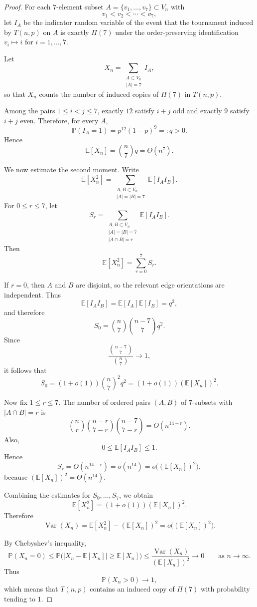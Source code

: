 \documentclass{article}
\theoremstyle{definition}
\theoremstyle{plain}
\theoremstyle{remark}
\theoremstyle{definition}
\begin{document}
\begin{proof}
For each $7$-element subset $A=\{v_1,\dots,v_7\}\subset V_n$ with
\[
v_1<v_2<\cdots<v_7,
\]
let $I_A$ be the indicator random variable of the event that the tournament induced by $T(n,p)$ on $A$
is exactly $\Pi(7)$ under the order-preserving identification $v_i\mapsto i$ for $i=1,\dots,7$.

Let
\[
X_n=\sum_{\substack{A\subset V_n\\ |A|=7}} I_A,
\]
so that $X_n$ counts the number of induced copies of $\Pi(7)$ in $T(n,p)$.

Among the pairs $1\le i<j\le 7$, exactly $12$ satisfy $i+j$ odd and exactly $9$ satisfy $i+j$ even.
Therefore, for every $A$,
\[
\mathbb P(I_A=1)=p^{12}(1-p)^9=:q>0.
\]
Hence
\[
\mathbb E[X_n]=\binom{n}{7}q=\Theta(n^7).
\]

We now estimate the second moment.
Write
\[
\mathbb E[X_n^2]
=
\sum_{\substack{A,B\subset V_n\\ |A|=|B|=7}}
\mathbb E[I_A I_B].
\]
For $0\le r\le 7$, let
\[
S_r
=
\sum_{\substack{A,B\subset V_n\\ |A|=|B|=7\\ |A\cap B|=r}}
\mathbb E[I_A I_B].
\]
Then
\[
\mathbb E[X_n^2]=\sum_{r=0}^7 S_r.
\]

If $r=0$, then $A$ and $B$ are disjoint, so the relevant edge orientations are independent. Thus
\[
\mathbb E[I_A I_B]=\mathbb E[I_A]\mathbb E[I_B]=q^2,
\]
and therefore
\[
S_0=\binom{n}{7}\binom{n-7}{7}q^2.
\]
Since
\[
\frac{\binom{n-7}{7}}{\binom{n}{7}}\to 1,
\]
it follows that
\[
S_0=(1+o(1))\binom{n}{7}^2 q^2=(1+o(1))(\mathbb E[X_n])^2.
\]

Now fix $1\le r\le 7$.
The number of ordered pairs $(A,B)$ of $7$-subsets with $|A\cap B|=r$ is
\[
\binom{n}{r}\binom{n-r}{7-r}\binom{n-7}{7-r}=O(n^{14-r}).
\]
Also,
\[
0\le \mathbb E[I_A I_B]\le 1.
\]
Hence
\[
S_r=O(n^{14-r})=o(n^{14})=o\bigl((\mathbb E[X_n])^2\bigr),
\]
because $(\mathbb E[X_n])^2=\Theta(n^{14})$.

Combining the estimates for $S_0,\dots,S_7$, we obtain
\[
\mathbb E[X_n^2]=(1+o(1))(\mathbb E[X_n])^2.
\]
Therefore
\[
\operatorname{Var}(X_n)
=
\mathbb E[X_n^2]-(\mathbb E[X_n])^2
=
o\bigl((\mathbb E[X_n])^2\bigr).
\]

By Chebyshev's inequality,
\[
\mathbb P(X_n=0)
\le
\mathbb P\bigl(|X_n-\mathbb E[X_n]|\ge \mathbb E[X_n]\bigr)
\le
\frac{\operatorname{Var}(X_n)}{(\mathbb E[X_n])^2}
\longrightarrow 0
\qquad\text{as }n\to\infty.
\]
Thus
\[
\mathbb P(X_n>0)\longrightarrow 1,
\]
which means that $T(n,p)$ contains an induced copy of $\Pi(7)$ with probability tending to $1$.
\end{proof}
\end{document}
